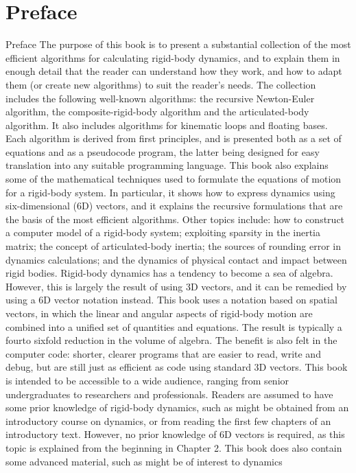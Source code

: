 \chapter*{Preface}
Preface The purpose of this book is to present a substantial collection of the most efficient algorithms for calculating rigid-body dynamics, and to explain them in enough detail that the reader can understand how they work, and how to adapt them (or create new algorithms) to suit the reader’s needs. The collection includes the following well-known algorithms: the recursive Newton-Euler algorithm, the composite-rigid-body algorithm and the articulated-body algorithm. It also includes algorithms for kinematic loops and floating bases. Each algorithm is derived from first principles, and is presented both as a set of equations and as a pseudocode program, the latter being designed for easy translation into any suitable programming language. This book also explains some of the mathematical techniques used to formulate the equations of motion for a rigid-body system. In particular, it shows how to express dynamics using six-dimensional (6D) vectors, and it explains the recursive formulations that are the basis of the most efficient algorithms. Other topics include: how to construct a computer model of a rigid-body system; exploiting sparsity in the inertia matrix; the concept of articulated-body inertia; the sources of rounding error in dynamics calculations; and the dynamics of physical contact and impact between rigid bodies. Rigid-body dynamics has a tendency to become a sea of algebra. However, this is largely the result of using 3D vectors, and it can be remedied by using a 6D vector notation instead. This book uses a notation based on spatial vectors, in which the linear and angular aspects of rigid-body motion are combined into a unified set of quantities and equations. The result is typically a fourto sixfold reduction in the volume of algebra. The benefit is also felt in the computer code: shorter, clearer programs that are easier to read, write and debug, but are still just as efficient as code using standard 3D vectors. This book is intended to be accessible to a wide audience, ranging from senior undergraduates to researchers and professionals. Readers are assumed to have some prior knowledge of rigid-body dynamics, such as might be obtained from an introductory course on dynamics, or from reading the first few chapters of an introductory text. However, no prior knowledge of 6D vectors is required, as this topic is explained from the beginning in Chapter 2. This book does also contain some advanced material, such as might be of interest to dynamics

